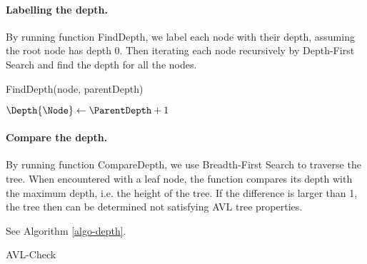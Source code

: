 \begin{questions}
\begin{parts}
        \paragraph{Labelling the depth.} By running function FindDepth, we label each node with their depth, assuming the root node has depth 0. Then iterating each node recursively by Depth-First Search and find the depth for all the nodes.

        \begin{procedure}
            \caption{FindDepth(node, parentDepth)}
            \label{func-finddepth}


            $\Depth{\Node}\gets \ParentDepth + 1$

            \If{$\Depth{\Node} > \MaxDepth$}{$\MaxDepth\gets \Depth{\Node}$}

            {
                \Exit
            }



        \end{procedure}

        \paragraph{Compare the depth.} By running function CompareDepth, we use Breadth-First Search to traverse the tree. When encountered with a leaf node, the function compares its depth with the maximum depth, i.e. the height of the tree. If the difference is larger than 1, the tree then can be determined not satisfying AVL tree properties.

        See Algorithm \ref*{algo-depth}.

        \begin{algorithm}
            \caption{AVL-Check}
            \label{algo-depth}


\end{algorithm}
\end{parts}
\end{questions}
